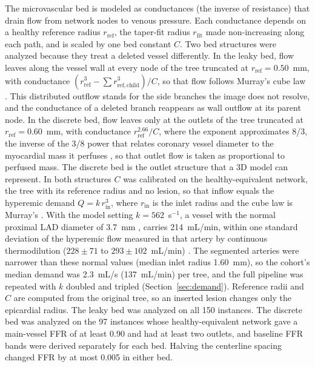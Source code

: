 \documentclass[journal,twoside,web]{ieeecolor}
\begin{document}
The microvascular bed is modeled as conductances (the inverse of resistance) that drain flow from network nodes to
venous pressure. Each conductance depends on a healthy reference radius $r_\mathrm{ref}$, the taper-fit radius
$r_\mathrm{fit}$ made non-increasing along each path, and is scaled by one bed constant $C$. Two bed structures were analyzed because they treat a deleted vessel differently. In the leaky
bed, flow leaves along the vessel wall at every node of the tree truncated at $r_\mathrm{ref} = 0.50$~mm, with
conductance $(r_\mathrm{ref}^3 - \sum r_{\mathrm{ref},\mathrm{child}}^3)/C$, so that flow follows Murray's cube law
\cite{murray1926}. This distributed outflow stands for the side branches the image does not resolve, and the
conductance of a deleted branch reappears as wall outflow at its parent node. In the discrete bed, flow leaves only
at the outlets of the tree truncated at $r_\mathrm{ref} = 0.60$~mm, with conductance $r_\mathrm{ref}^{2.66}/C$,
where the exponent approximates 8/3, the inverse of the 3/8 power that relates coronary vessel diameter to the
myocardial mass it perfuses \cite{choy2008}, so that outlet flow is taken as proportional to perfused mass. The discrete bed is the outlet structure that a 3D model can
represent. In both structures $C$ was calibrated on the healthy-equivalent network, the tree with its reference
radius and no lesion, so that inflow equals the hyperemic demand $Q = k\,r_\mathrm{in}^3$, where $r_\mathrm{in}$ is
the inlet radius and the cube law is Murray's \cite{murray1926}. With the model setting $k = 562$~s$^{-1}$, a
vessel with the normal proximal LAD diameter of 3.7~mm \cite{dodge1992}, carries 214~mL/min,
within one standard deviation of the hyperemic flow measured in that artery by continuous thermodilution
($228 \pm 71$ to $293 \pm 102$~mL/min) \cite{fournier2021}. The segmented arteries were narrower than these
normal values (median inlet radius 1.60~mm), so the cohort's median demand was 2.3~mL/s (137~mL/min) per tree, and
the full pipeline was repeated with $k$ doubled and tripled (Section~\ref{sec:demand}). Reference radii and $C$ are computed from the original tree, so an inserted lesion changes
only the epicardial radius. The leaky bed was analyzed on all 150 instances. The discrete bed was analyzed on the
97 instances whose healthy-equivalent network gave a main-vessel FFR of at least 0.90 and had at least two outlets,
and baseline FFR bands were derived separately for each bed. Halving the centerline spacing changed FFR by at most
0.005 in either bed.
\end{document}
